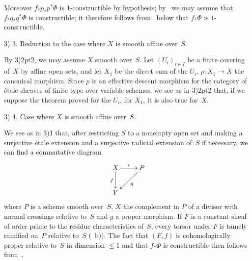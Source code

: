 Moreover $f_*p_*p^*\Phi$ is $1$-constructible by hypothesis;
by~ we may assume that $f_*q_*q^*\Phi$ is
constructible; it therefore follows from~ below that
$f_*\Phi$ is $1$-constructible.

3) 3. Reduction to the case where $X$ is smooth affine over~$S$.

By 3)\kern2pt2, we may assume $X$ smooth over~$S$. Let $(U_i)_{i\in
I}$ be a finite covering of~$X$ by affine open sets, and let $X_1$
be the direct sum of the $U_i$, $p\colon X_1 \to X$ the canonical
morphism. Since $p$ is an effective descent morphism for the
category of \'etale sheaves of finite type over
variable schemes, we see as in 3)\kern2pt2 that, if we suppose the
theorem proved for the $U_i$, \ie for $X_1$, it
is also true for~$X$.

3) 4. Case where $X$ is smooth affine over~$S$.

We see as in 3)1 that, after restricting $S$ to a
nonempty open set and making a surjective \'etale extension and a
surjective radicial extension of~$S$ if necessary, we can find a
commutative diagram
$$
\xymatrix{ X \ar[r]^{i} \ar[d]_{f} & P \ar[ld]^{q} \\ Y }
$$
where $P$ is a scheme smooth over~$S$, $X$ the complement
in $P$ of a divisor with normal crossings relative to~$S$ and $g$ a proper
morphism. If $F$ is a constant sheaf
of order prime to the residue characteristics of~$S$, every
torsor under $F$ is tamely ramified on~$P$
relative to~$S$ (~b)). The fact that $(F,f)$ is
cohomologically proper relative to~$S$ in dimension $\le 1$
and that $f_*\Phi$ is constructible then follows
from~.
